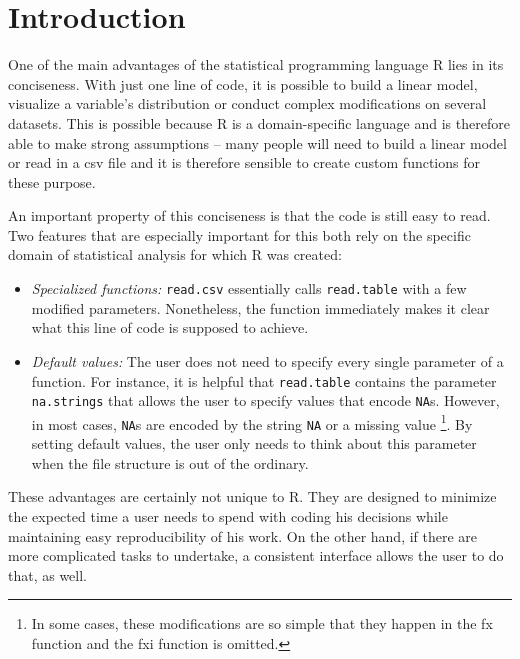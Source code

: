 \documentclass[]{report}
\let\rmarkdownfootnote\footnote%
\def\footnote{\protect\rmarkdownfootnote}
\theoremstyle{definition}
\theoremstyle{definition}
\theoremstyle{definition}
\theoremstyle{remark}
\begin{document}
\tableofcontents

\chapter{Introduction}\label{intro}

 \setcounter{page}{1}

One of the main advantages of the statistical programming language R
\citep{R} lies in its conciseness. With just one line of code, it is
possible to build a linear model, visualize a variable's distribution or
conduct complex modifications on several datasets. This is possible
because R is a domain-specific language and is therefore able to make
strong assumptions -- many people will need to build a linear model or
read in a csv file and it is therefore sensible to create custom
functions for these purpose.

An important property of this conciseness is that the code is still easy
to read. Two features that are especially important for this both rely
on the specific domain of statistical analysis for which R was created:

\begin{itemize}
\item
  \emph{Specialized functions:} \texttt{read.csv} essentially calls
  \texttt{read.table} with a few modified parameters. Nonetheless, the
  function immediately makes it clear what this line of code is supposed
  to achieve.
\item
  \emph{Default values:} The user does not need to specify every single
  parameter of a function. For instance, it is helpful that
  \texttt{read.table} contains the parameter \texttt{na.strings} that
  allows the user to specify values that encode \texttt{NA}s. However,
  in most cases, \texttt{NA}s are encoded by the string \texttt{NA} or a
  missing value \footnote{In some cases, these modifications are so
    simple that they happen in the fx function and the fxi function is
    omitted.}. By setting default values, the user only needs to think
  about this parameter when the file structure is out of the ordinary.
\end{itemize}

These advantages are certainly not unique to R. They are designed to
minimize the expected time a user needs to spend with coding his
decisions while maintaining easy reproducibility of his work. On the
other hand, if there are more complicated tasks to undertake, a
consistent interface allows the user to do that, as well.
\end{document}
